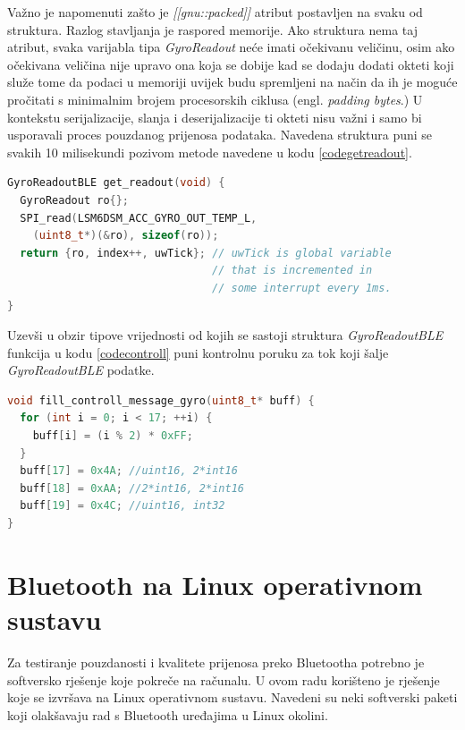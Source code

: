 \documentclass[times, utf8, diplomski]{diplomski}
\begin{document}
Važno je napomenuti zašto je \textit{[[gnu::packed]]} atribut postavljen na svaku od struktura. Razlog stavljanja je raspored memorije.
Ako struktura nema taj atribut, svaka varijabla tipa \textit{GyroReadout} neće imati očekivanu veličinu, osim ako očekivana veličina nije upravo ona koja se dobije kad se dodaju dodati okteti koji služe tome da podaci u memoriji uvijek budu spremljeni na način da ih je moguće pročitati s minimalnim brojem procesorskih ciklusa (engl. \textit{padding bytes}.)
U kontekstu serijalizacije, slanja i deserijalizacije ti okteti nisu važni i samo bi usporavali proces pouzdanog prijenosa podataka.
Navedena struktura puni se svakih 10 milisekundi pozivom metode navedene u kodu \ref{codegetreadout}.

\begin{lstlisting}[language=c++, caption={Dohvaćanje očitanja s LSM6DSM senzora}, label={codegetreadout}]
GyroReadoutBLE get_readout(void) {
  GyroReadout ro{};
  SPI_read(LSM6DSM_ACC_GYRO_OUT_TEMP_L,
    (uint8_t*)(&ro), sizeof(ro));
  return {ro, index++, uwTick}; // uwTick is global variable
                                // that is incremented in 
                                // some interrupt every 1ms.
}
\end{lstlisting}

Uzevši u obzir tipove vrijednosti od kojih se sastoji struktura \textit{GyroReadoutBLE} funkcija u kodu \ref{codecontroll} puni kontrolnu poruku za tok koji šalje \textit{GyroReadoutBLE} podatke.

\begin{lstlisting}[language=c++, caption={Funkcija koja puni kontrolnu poruku za žiroskopske podatke}, label={codecontroll}]
void fill_controll_message_gyro(uint8_t* buff) {
  for (int i = 0; i < 17; ++i) {
    buff[i] = (i % 2) * 0xFF;
  }
  buff[17] = 0x4A; //uint16, 2*int16
  buff[18] = 0xAA; //2*int16, 2*int16
  buff[19] = 0x4C; //uint16, int32
}
\end{lstlisting}

\section{Bluetooth na Linux operativnom sustavu}
Za testiranje pouzdanosti i kvalitete prijenosa preko Bluetootha potrebno je softversko rješenje koje pokreče na računalu. U ovom radu korišteno je rješenje koje se izvršava na Linux operativnom sustavu. Navedeni su neki softverski paketi koji olakšavaju rad s Bluetooth uređajima u Linux okolini.
\end{document}
